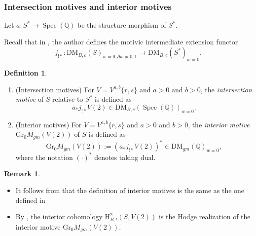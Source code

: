\documentclass[11pt, a4paper]{amsart}
\theoremstyle{plain}
\theoremstyle{definition}
\newtheorem{definition}[theorem]{Definition}
\newtheorem{remark}[theorem]{Remark}
\numberwithin{equation}{section}
\def\QQ{\mathbb{Q}}
\DeclareMathOperator{\Spec}{Spec}
\begin{document}
\subsubsection{Intersection motives and interior motives}
Let $a \colon S^{*} \rightarrow \Spec(\QQ)$ be the structure morphism of $S^{*}$.
\par Recall that in \cite[Definition 2.4]{Wild_ChowII_20}, the author defines the motivic intermediate extension functor 
\begin{equation*}
    j_{!*} \colon \mathrm{DM}_{B, c}(S)_{w = 0, \partial w \neq 0, 1} \rightarrow \mathrm{DM}_{B, c}(S^{*})_{w = 0}. 
\end{equation*}

\begin{definition}
\label{def: intersection motive and interior motive}
    \begin{enumerate}
        \item (\textnormal{Intersection motives}) For $V = V^{a, b}\{r, s\}$ and $a > 0$ and $b > 0$, the \textit{intersection motive} of $S$ relative to $S^{*}$ is defined as 
        \begin{equation*}
            a_{*}j_{!*}V(2) \in \mathrm{DM}_{B, c}(\Spec(\QQ))_{w = 0}. 
        \end{equation*}
        \item (\textnormal{Interior motives})  For $V = V^{a, b}\{r, s\}$ and $a > 0$ and $b > 0$, the \textit{interior motive} $\mathrm{Gr_{0}}M_{gm}(V(2))$ of $S$ is defined as 
        \begin{equation*}
            \mathrm{Gr_{0}}M_{gm}(V(2)) := (a_{*}j_{!*}V(2))^{*} \in \mathrm{DM}_{gm}(\QQ)_{w = 0},
        \end{equation*}
        where the notation $(\cdot)^{*}$ denotes taking dual. 
    \end{enumerate}
    
\end{definition}

\begin{remark}
    \begin{itemize}
        \item 
        It follows from \cite[Corollary 3.10(b)]{Wild_ChowII_20} that the definition of interior motives is the same as the one defined in \cite[Corollary 3.9]{Wild_15}
        \item By \cite[Remark 3.13(a)]{Wild_ChowII_20}, the interior cohomology $\mathrm{H}^{2}_{B, !}(S, V(2))$ is the Hodge realization of the interior motive $\mathrm{Gr_{0}}M_{gm}(V(2))$. 
    \end{itemize}
\end{remark}
\end{document}
